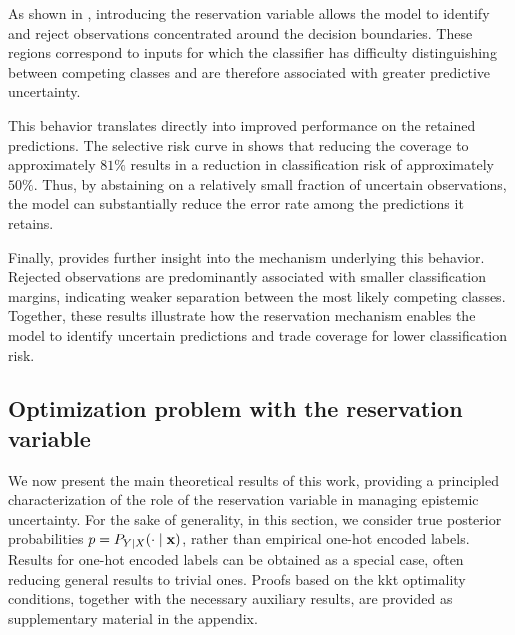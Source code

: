 As shown in , introducing the reservation variable allows the model to identify and reject observations concentrated around the decision boundaries. These regions correspond to inputs for which the classifier has difficulty distinguishing between competing classes and are therefore associated with greater predictive uncertainty.

This behavior translates directly into improved performance on the retained predictions. The selective risk curve in  shows that reducing the coverage to approximately \(81\%\) results in a reduction in classification risk of approximately \(50\%\). Thus, by abstaining on a relatively small fraction of uncertain observations, the model can substantially reduce the error rate among the predictions it retains.

Finally,  provides further insight into the mechanism underlying this behavior. Rejected observations are predominantly associated with smaller classification margins, indicating weaker separation between the most likely competing classes. Together, these results illustrate how the reservation mechanism enables the model to identify uncertain predictions and trade coverage for lower classification risk.

\subsection{Optimization problem with the reservation variable}
\label{subsec:optimization_problem}

We now present the main theoretical results of this work, providing a principled characterization of the role of the reservation variable in managing epistemic uncertainty. For the sake of generality, in this section, we consider true posterior probabilities \(p=P_{Y|X}(\cdot\mid\mathbf{x})\), rather than empirical one-hot encoded labels. Results for one-hot encoded labels can be obtained as a special case, often reducing general results to trivial ones. Proofs based on the \gls*{kkt} optimality conditions, together with the necessary auxiliary results, are provided as supplementary material in the appendix.

